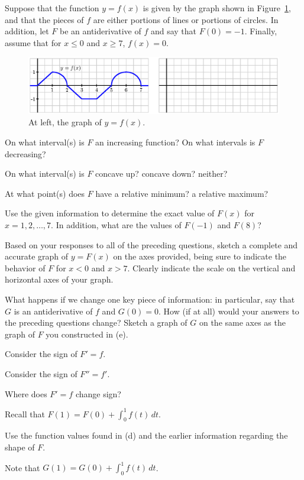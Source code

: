 \begin{activity} \label{A:5.1.1}  Suppose that the function $y = f(x)$ is given by the graph shown in Figure~\ref{F:5.1.Act1}, and that the pieces of $f$ are either portions of lines or portions of circles.  In addition, let $F$ be an antiderivative of $f$ and say that $F(0) = -1$.  Finally, assume that for $x \le 0$ and $x \ge 7$, $f(x) = 0$.
\begin{figure}[h]
\begin{center}
\includegraphics{figures/5_1_Act1.eps}
\end{center}
\caption{At left, the graph of $y = f(x)$.} \label{F:5.1.Act1}
\end{figure}
\ba
	\item On what interval(s) is $F$ an increasing function?  On what intervals is $F$ decreasing?
	\item On what interval(s) is $F$ concave up?  concave down? neither?
	\item At what point(s) does $F$ have a relative minimum?  a relative maximum?
	\item Use the given information to determine the exact value of $F(x)$ for $x = 1, 2, \ldots, 7$.  In addition, what are the values of $F(-1)$ and $F(8)$?
	\item Based on your responses to all of the preceding questions, sketch a complete and accurate graph of $y = F(x)$ on the axes provided, being sure to indicate the behavior of $F$ for $x < 0$ and $x > 7$.  Clearly indicate the scale on the vertical and horizontal axes of your graph.
	\item What happens if we change one key piece of information:  in particular, say that $G$ is an antiderivative of $f$ and $G(0) = 0$.  How (if at all) would your answers to the preceding questions change?  Sketch a graph of $G$ on the same axes as the graph of $F$ you constructed in (e).
\ea
\end{activity}
\begin{smallhint}
\ba
	\item Consider the sign of $F' = f$.
	\item Consider the sign of $F'' = f'$.
	\item Where does $F' = f$ change sign?
	\item Recall that $F(1) = F(0) + \int_0^1 f(t) \, dt$.
	\item Use the function values found in (d) and the earlier information regarding the shape of $F$.
	\item Note that $G(1) = G(0) + \int_0^1 f(t) \, dt$. 
\ea
\end{smallhint}
